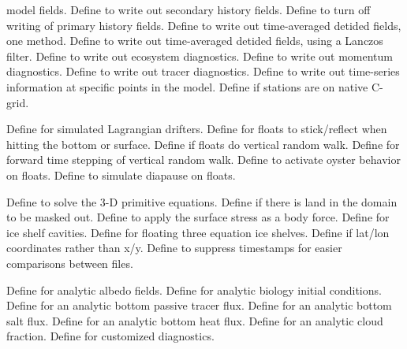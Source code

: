 \begin{klist}
\begin{klist}
  model fields.
           Define to write out secondary history fields.
         Define to turn off writing of primary history fields.
        Define to write out time-averaged
  detided fields, one method.
        Define to write out time-averaged
  detided fields, using a Lanczos filter.
     Define to write out ecosystem diagnostics.
     Define to write out momentum diagnostics.
     Define to write out tracer diagnostics.
        Define to write out time-series
  information at specific points in the model.
        Define if stations are on native C-grid.
  \end{klist}
   \mbox{}
  \begin{klist}
        Define for simulated Lagrangian drifters.
      Define for floats to stick/reflect when
    hitting the bottom or surface.
      Define if floats do vertical random walk.
     Define for forward time stepping of vertical
  random walk.
      Define to activate oyster behavior on
  floats.
      Define to simulate diapause on floats.
  \end{klist}
   \mbox{}
  \begin{klist}
         Define to solve the 3-D primitive
  equations.
       Define if there is land in the domain to be
   masked out.
       Define to apply the surface
  stress as a body force.
        Define for ice shelf cavities.
      Define for floating three equation ice shelves.
       Define if lat/lon coordinates rather than x/y.
      Define to suppress timestamps for easier
    comparisons between files.
  \end{klist}
   \mbox{}
  \begin{klist}
      Define for analytic albedo fields.
     Define for analytic biology initial conditions.
      Define for an analytic bottom passive tracer flux.
      Define for an analytic bottom salt flux.
      Define for an analytic bottom heat flux.
       Define for an analytic cloud fraction.
        Define for customized diagnostics.

\end{klist}
\end{klist}
